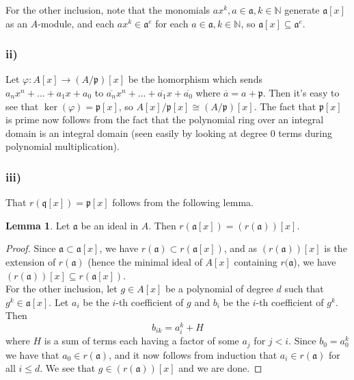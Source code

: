 \documentclass{article}
\let\temp\phi
\let\phi\varphi
\let\varphi\temp
\theoremstyle{definition}
\newtheorem{lemma}[theorem]{Lemma}
\newcommand{\N}{\mathbb{N}}
\begin{document}
For the other inclusion, note that the monomials $a x^k, a \in
\mathfrak{a}, k \in \N$ generate $\mathfrak{a}[x]$ as an $A$-module, and
each $a x^k \in \mathfrak{a}^{e}$ for each $a \in \mathfrak{a}, k \in \N$,
so $\mathfrak{a}[x] \subseteq \mathfrak{a}^{e}$.

\subsubsection*{ii)}

Let $\phi : A[x] \to (A/\mathfrak{p})[x]$ be the homorphism which sends $a_n
x^n + \ldots + a_1 x + a_0$ to $\overline{a_n}x^n + \ldots + \overline{a_1} x +
\overline{a_0}$ where $\overline{a} = a + \mathfrak{p}$. Then it's easy to see
that $\ker(\phi) = \mathfrak{p}[x]$, so $A[x]/\mathfrak{p}[x] \cong
(A/\mathfrak{p})[x]$. The fact that $\mathfrak{p}[x]$ is prime now follows from
the fact that the polynomial ring over an integral domain is an integral domain
(seen easily by looking at degree $0$ terms during polynomial multiplication). 

\subsubsection*{iii)}

That $r(\mathfrak{q}[x]) = \mathfrak{p}[x]$ follows from the following lemma. 
\begin{lemma}
	Let $\mathfrak{a}$ be an ideal in $A$. Then $r(\mathfrak{a}[x]) = (r(\mathfrak{a}))[x]$.
\end{lemma}
\begin{proof}
	Since $\mathfrak{a} \subset \mathfrak{a}[x]$, we have $r(\mathfrak{a})
	\subset r(\mathfrak{a}[x])$, and as $(r(\mathfrak{a}))[x]$ is the extension
	of $r(\mathfrak{a})$ (hence the minimal ideal of $A[x]$ containing
	$r(\mathfrak{a}$), we have $(r(\mathfrak{a}))[x] \subseteq
	r(\mathfrak{a}[x])$. \\

	For the other inclusion, let $g \in A[x]$ be a polynomial of degree $d$
	such that $g^k \in \mathfrak{a}[x]$. Let $a_i$ be the $i$-th coefficient 
	of $g$ and $b_i$ be the $i$-th coefficient of $g^k$. Then
	\[
		b_{ik}
		=
		a_{i}^{k} + H
	\] 
	where $H$ is a sum of terms each having a factor of some $a_j$ for $j < i$.
	Since $b_0 = a_0^k$ we have that $a_0 \in r(\mathfrak{a})$, and it now
	follows from induction that $a_i \in r(\mathfrak{a})$ for all $i \leq d$.
	We see that $g \in (r(\mathfrak{a}))[x]$ and we are done.
\end{proof}
\end{document}
